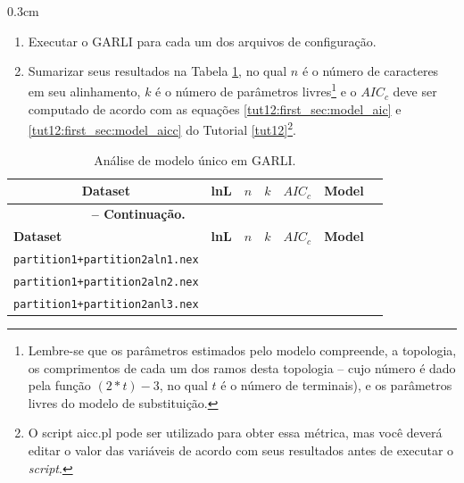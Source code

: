 \begin{refsection}
\begin {myindentpar}{0.3cm}
\begin{enumerate}[\itshape 1.]
    \item{Executar o GARLI para cada um dos arquivos de configuração.}

    \item{Sumarizar seus resultados na Tabela \ref{tut13:ex:13.2}, no qual $n$ é o número de caracteres em seu alinhamento, $k$ é o número de parâmetros livres\footnote{ Lembre-se que os parâmetros estimados pelo modelo compreende, a topologia, os comprimentos de cada um dos ramos desta topologia  -- cujo número é dado pela função $(2*t)-3$, no qual $t$ é o número de terminais), e os parâmetros livres do modelo de substituição.} e o $AIC_{c}$ deve ser computado de acordo com as equações \ref{tut12:first_sec:model_aic} e \ref{tut12:first_sec:model_aicc} do Tutorial \ref{tut12}\footnote{ O script aicc.pl pode ser utilizado para obter essa métrica, mas você deverá editar o valor das variáveis de acordo com seus resultados antes de executar o \textit{script}.}.}

\end{enumerate}
\end{myindentpar}


\pagestyle{fancy}
\begin{center}

\begin{longtable}{|l|>{\centering}m{2cm}|>{\centering}m{1cm}|c|>{\centering}m{2cm}|>{\centering}m{2cm} |@{}m{0pt}@{}}
\caption[Análise de modelo único em GARLI.]{Análise de modelo único em GARLI.} \label{tut13:ex:13.2} \\

\hline\hline  \multicolumn{1}{|c|}{\textbf{Dataset}} & \textbf{lnL}  & \textbf{$n$} & \textbf{$k$} & \textbf{$AIC_{c}$} & \textbf{Model} &\\
\endfirsthead

\multicolumn{3}{c}{{\bfseries \tablename\ \thetable{} -- Continuação.}}\\
\hline\hline \textbf{Dataset} & \textbf{lnL}  & \textbf{$n$} & \textbf{$k$} & \textbf{$AIC_{c}$} & \textbf{Model} &\\
\endhead
\hline \hline
\endlastfoot
\hline \scriptsize\texttt{partition1+partition2aln1.nex} & & & & & &\\
\hline \scriptsize\texttt{partition1+partition2aln2.nex} & & & & & &\\
\hline \scriptsize\texttt{partition1+partition2anl3.nex} & & & & & &\\
\end{longtable}
\end{center}




\end{refsection}
